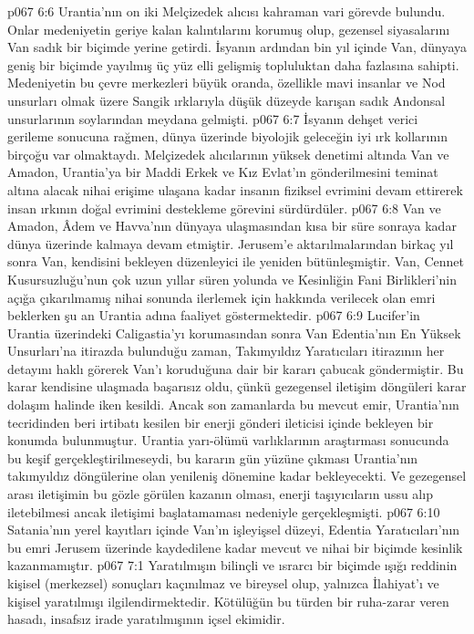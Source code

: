 \vs p067 6:6 Urantia’nın on iki Melçizedek alıcısı kahraman vari görevde bulundu. Onlar medeniyetin geriye kalan kalıntılarını korumuş olup, gezensel siyasalarını Van sadık bir biçimde yerine getirdi. İsyanın ardından bin yıl içinde Van, dünyaya geniş bir biçimde yayılmış üç yüz elli gelişmiş topluluktan daha fazlasına sahipti. Medeniyetin bu çevre merkezleri büyük oranda, özellikle mavi insanlar ve Nod unsurları olmak üzere Sangik ırklarıyla düşük düzeyde karışan sadık Andonsal unsurlarının soylarından meydana gelmişti.
\vs p067 6:7 İsyanın dehşet verici gerileme sonucuna rağmen, dünya üzerinde biyolojik geleceğin iyi ırk kollarının birçoğu var olmaktaydı. Melçizedek alıcılarının yüksek denetimi altında Van ve Amadon, Urantia’ya bir Maddi Erkek ve Kız Evlat’ın gönderilmesini teminat altına alacak nihai erişime ulaşana kadar insanın fiziksel evrimini devam ettirerek insan ırkının doğal evrimini destekleme görevini sürdürdüler.
\vs p067 6:8 Van ve Amadon, Âdem ve Havva’nın dünyaya ulaşmasından kısa bir süre sonraya kadar dünya üzerinde kalmaya devam etmiştir. Jerusem’e aktarılmalarından birkaç yıl sonra Van, kendisini bekleyen düzenleyici ile yeniden bütünleşmiştir. Van, Cennet Kusursuzluğu’nun çok uzun yıllar süren yolunda ve Kesinliğin Fani Birlikleri’nin açığa çıkarılmamış nihai sonunda ilerlemek için hakkında verilecek olan emri beklerken şu an Urantia adına faaliyet göstermektedir.
\vs p067 6:9 Lucifer’in Urantia üzerindeki Caligastia’yı korumasından sonra Van Edentia’nın En Yüksek Unsurları’na itirazda bulunduğu zaman, Takımyıldız Yaratıcıları itirazının her detayını haklı görerek Van’ı koruduğuna dair bir kararı çabucak göndermiştir. Bu karar kendisine ulaşmada başarısız oldu, çünkü gezegensel iletişim döngüleri karar dolaşım halinde iken kesildi. Ancak son zamanlarda bu mevcut emir, Urantia’nın tecridinden beri irtibatı kesilen bir enerji gönderi ileticisi içinde bekleyen bir konumda bulunmuştur. Urantia yarı\hyp{}ölümü varlıklarının araştırması sonucunda bu keşif gerçekleştirilmeseydi, bu kararın gün yüzüne çıkması Urantia’nın takımyıldız döngülerine olan yenileniş dönemine kadar bekleyecekti. Ve gezegensel arası iletişimin bu gözle görülen kazanın olması, enerji taşıyıcıların ussu alıp iletebilmesi ancak iletişimi başlatamaması nedeniyle gerçekleşmişti.
\vs p067 6:10 Satania’nın yerel kayıtları içinde Van’ın işleyişsel düzeyi, Edentia Yaratıcıları’nın bu emri Jerusem üzerinde kaydedilene kadar mevcut ve nihai bir biçimde kesinlik kazanmamıştır.
\vs p067 7:1 Yaratılmışın bilinçli ve ısrarcı bir biçimde ışığı reddinin kişisel (merkezsel) sonuçları kaçınılmaz ve bireysel olup, yalnızca İlahiyat’ı ve kişisel yaratılmışı ilgilendirmektedir. Kötülüğün bu türden bir ruha\hyp{}zarar veren hasadı, insafsız irade yaratılmışının içsel ekimidir.

